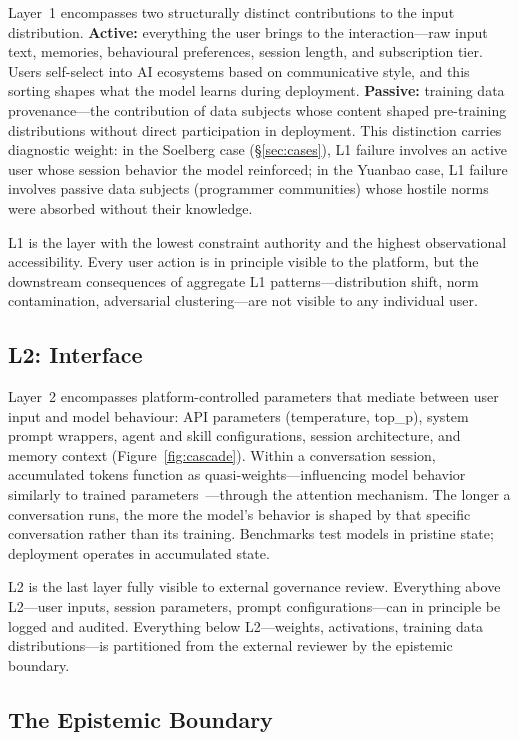 \documentclass[11pt]{article}
\begin{document}
Layer~1 encompasses two structurally distinct contributions to the input distribution. \textbf{Active:} everything the user brings to the interaction---raw input text, memories, behavioural preferences, session length, and subscription tier. Users self-select into AI ecosystems based on communicative style, and this sorting shapes what the model learns during deployment. \textbf{Passive:} training data provenance---the contribution of data subjects whose content shaped pre-training distributions without direct participation in deployment. This distinction carries diagnostic weight: in the Soelberg case (\S\ref{sec:cases}), L1 failure involves an active user whose session behavior the model reinforced; in the Yuanbao case, L1 failure involves passive data subjects (programmer communities) whose hostile norms were absorbed without their knowledge.

L1 is the layer with the lowest constraint authority and the highest observational accessibility. Every user action is in principle visible to the platform, but the downstream consequences of aggregate L1 patterns---distribution shift, norm contamination, adversarial clustering---are not visible to any individual user.

\subsection{L2: Interface}

Layer~2 encompasses platform-controlled parameters that mediate between user input and model behaviour: API parameters (temperature, top\_p), system prompt wrappers, agent and skill configurations, session architecture, and memory context (Figure~\ref{fig:cascade}). Within a conversation session, accumulated tokens function as quasi-weights---influencing model behavior similarly to trained parameters~\cite{dai2023can, olsson2022context}---through the attention mechanism. The longer a conversation runs, the more the model's behavior is shaped by that specific conversation rather than its training. Benchmarks test models in pristine state; deployment operates in accumulated state.

L2 is the last layer fully visible to external governance review. Everything above L2---user inputs, session parameters, prompt configurations---can in principle be logged and audited. Everything below L2---weights, activations, training data distributions---is partitioned from the external reviewer by the epistemic boundary.

\subsection{The Epistemic Boundary}
\end{document}
